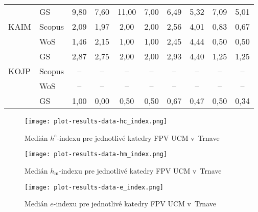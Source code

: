 \begin{table}
\begin{tabularx}{\textwidth}{XXcccc@{\hspace{3ex}}cccc}
      & GS     & 9,80     & 7,60 & 11,00 & 7,00 & 6,49     & 5,32 & 7,09 & 5,01 \\[3ex]
 KAIM & Scopus & 2,09     & 1,97 & 2,00  & 2,00 & 2,56     & 4,01 & 0,83 & 0,67 \\
      & WoS    & 1,46     & 2,15 & 1,00  & 1,00 & 2,45     & 4,44 & 0,50 & 0,50 \\
      & GS     & 2,87     & 2,75 & 2,00  & 2,00 & 2,93     & 4,40 & 1,25 & 1,25 \\[3ex]
 KOJP & Scopus & --       & --   & --    & --   & --       & --   & --   & --   \\
      & WoS    & --       & --   & --    & --   & --       & --   & --   & --   \\
      & GS     & 1,00     & 0,00 & 0,50  & 0,50 & 0,67     & 0,47 & 0,50 & 0,34 \\[0.5ex]
  \bottomrule
\end{tabularx}
\end{table}

\begin{figure}
  \centering
  \texttt{[image: plot-results-data-hc\_index.png]}
  \caption{Medián $h^\mathrm{c}$-indexu pre jednotlivé katedry FPV UCM v~Trnave}
  \label{fig:hc-index.plot}
\end{figure}

\begin{figure}
  \centering
  \texttt{[image: plot-results-data-hm\_index.png]}
  \caption{Medián $h_\mathrm{m}$-indexu pre jednotlivé katedry FPV UCM v~Trnave}
  \label{fig:hm-index.plot}
\end{figure}

\begin{figure}
  \centering
  \texttt{[image: plot-results-data-e\_index.png]}
  \caption{Medián $e$-indexu pre jednotlivé katedry FPV UCM v~Trnave}
  \label{fig:e-index.plot}
\end{figure}


